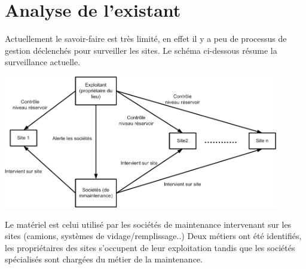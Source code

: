 \section{Analyse de l'existant}

Actuellement le savoir-faire est très limité, en effet il y a peu de processus de gestion déclenchés pour surveiller les sites. Le schéma ci-dessous résume la surveillance actuelle.

\includegraphics[width=0.9\textwidth]{img/schemaAnalyseExistant.png}

Le matériel est celui utilisé par les sociétés de maintenance intervenant sur les sites (camions, systèmes de vidage/remplissage..)
Deux métiers ont été identifiés, les propriétaires des sites s’occupent de leur exploitation tandis que les sociétés spécialisés sont chargées du métier de la maintenance.
